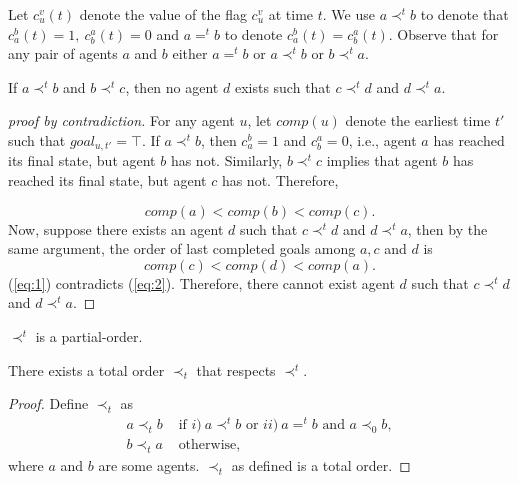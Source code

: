Let $c^v_u(t)$ denote the value of the flag $c^v_u$ at time $t$.
We use $a \prec^t b$ to denote that $c_a^b(t) =1,~c_b^a(t)=0$ and $a=^tb$ to denote $c_a^b(t) = c_b^a(t)$. Observe that for any pair of agents $a$ and $b$ either $a =^t b$ or $a \prec^t b$ or $b \prec^t a$. %


\begin{prop}
If $a \prec^t b$ and $b \prec^t c$, then no agent $d$ exists such that $c \prec^t d$ and $d \prec^t a$.
\end{prop}
\begin{proof}[proof by contradiction]
For any agent $u$, let $comp(u)$ denote the earliest time $t'$ such that $goal_{u,t'} = \top$.
If $a \prec^t b$, then $c^b_a = 1$ and $c_b^a = 0$, i.e., agent $a$ has reached its final state, but agent $b$ has not.  Similarly, $b \prec^t c$ implies that agent $b$ has reached its final state, but agent $c$ has not. Therefore, 

\begin{equation}
\label{eq:1}
comp(a) < comp(b) < comp(c).
\end{equation}
Now, suppose there exists an agent $d$ such that $c \prec^t d$ and $d \prec^t a$, then by the same argument, the order of last completed goals among $a,c$ and $d$ is 
\begin{equation}
\label{eq:2}
    comp(c) < comp(d) < comp(a).
\end{equation}
(\ref{eq:1}) contradicts (\ref{eq:2}). Therefore, there cannot exist agent $d$ such that $c \prec^t d$ and $d \prec^t a$. %
\end{proof}

\begin{cor}
$\prec^t$ is a partial-order.
\end{cor}

\begin{prop}
There exists a total order $\prec_t$ that respects $\prec^t$.
\end{prop}
\begin{proof}
Define $\prec_t$ as 
\begin{align}
    a \prec_t b &\text{ if }
                    i)~a \prec^t b \text{ or }
                    ii)~a =^t b \text{ and } a \prec_0 b, \\
    b \prec_t a &\text{ otherwise,}      \nonumber          
\end{align}
\noindent where $a$ and $b$ are some agents.
$\prec_t$ as defined is a total order. %
\end{proof}


